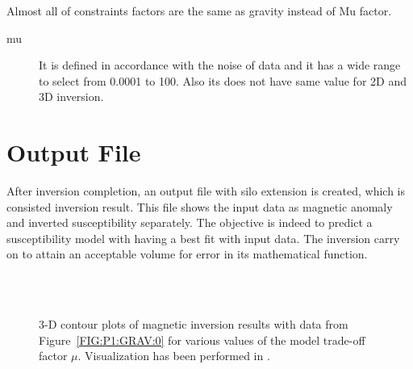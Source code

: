 Almost all of constraints factors are the same as gravity instead of Mu factor.\\

\begin{description} 	

\item[mu]
It is defined in accordance with the noise of data and it has a wide range to select from 0.0001 to 100. Also its does not have same value for 2D and 3D inversion.

\end{description}

\section{Output File}
After inversion completion, an output file with silo extension is created, which is consisted inversion result. This file shows the input data as magnetic anomaly and inverted susceptibility separately. The objective is indeed to  predict a susceptibility model with having a best fit with input data. The inversion carry on to attain an acceptable volume for error in its mathematical function. 





\begin{figure}
    \begin{center}
        \\ %
        \\ %
    \end{center}
    \caption{3-D contour plots of magnetic inversion results with data from
    Figure~\ref{FIG:P1:GRAV:0} for various values of the model trade-off
    factor $\mu$. Visualization has been performed in \VisIt.
    }
    \label{FIG:P1:GRAV:10}
\end{figure}

